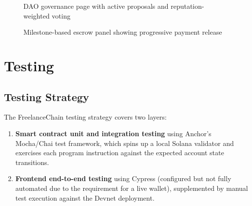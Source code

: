 \begin{figure}[H]
    \centering
    \caption{DAO governance page with active proposals and reputation-weighted voting}
    \label{fig:governance}
\end{figure}

\begin{figure}[H]
    \centering
    \caption{Milestone-based escrow panel showing progressive payment release}
    \label{fig:milestone_panel}
\end{figure}

\section{Testing}
\label{section:4.4}

\subsection{Testing Strategy}

The FreelanceChain testing strategy covers two layers:
\begin{enumerate}
    \item \textbf{Smart contract unit and integration testing} using Anchor's Mocha/Chai test framework, which spins up a local Solana validator and exercises each program instruction against the expected account state transitions.
    \item \textbf{Frontend end-to-end testing} using Cypress (configured but not fully automated due to the requirement for a live wallet), supplemented by manual test execution against the Devnet deployment.
\end{enumerate}


